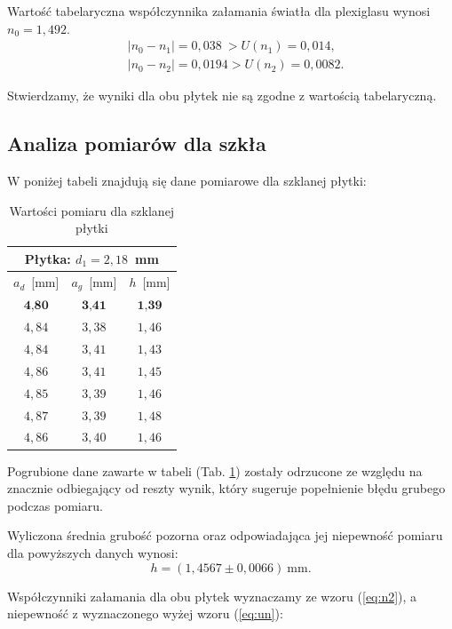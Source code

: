 \documentclass[12pt,a4paper]{article}
\numberwithin{equation}{section}
\begin{document}
Wartość tabelaryczna współczynnika załamania światła dla plexiglasu wynosi $n_0 = 1,492$.
\begin{equation}
	\begin{split}
		&|n_0 - n_1| = 0,038 ~> U(n_1) = 0,014, \\
		&|n_0 - n_2| = 0,0194 > U(n_2) = 0,0082.
	\end{split}
\end{equation}

Stwierdzamy, że wyniki dla obu płytek nie są zgodne z wartością tabelaryczną.

\subsection{Analiza pomiarów dla szkła}

W poniżej tabeli znajdują się dane pomiarowe dla szklanej płytki:

\begin{table}[!ht]
	\caption{Wartości pomiaru dla szklanej płytki}
	\centering
	\begin{tabular}{c|c|c}
		\hline \multicolumn{3}{c}{Płytka: $d_1 = 2,18$~mm} \\ \hline 
		$a_d$~[mm] & $a_g$~[mm] & $h$~[mm] \\ \hline \hline
		$\textbf{4,80}$ & $\textbf{3,41}$ & $\textbf{1,39}$ \\
		$4,84$ & $3,38$ & $1,46$ \\
		$4,84$ & $3,41$ & $1,43$ \\
		$4,86$ & $3,41$ & $1,45$ \\
		$4,85$ & $3,39$ & $1,46$ \\
		$4,87$ & $3,39$ & $1,48$ \\
		$4,86$ & $3,40$ & $1,46$ \\ \hline
	\end{tabular}
	\label{tab:tab2}
\end{table}

Pogrubione dane zawarte w tabeli (Tab. \ref{tab:tab2}) zostały odrzucone ze względu na znacznie odbiegający od reszty wynik, który sugeruje popełnienie błędu grubego podczas pomiaru.

\pagebreak
Wyliczona średnia grubość pozorna oraz odpowiadająca jej niepewność pomiaru dla powyższych danych wynosi:
\begin{equation}
	h = (1,4567 \pm 0,0066)~\textrm{mm}.
\end{equation}

Współczynniki załamania dla obu płytek wyznaczamy ze wzoru (\ref{eq:n2}), a niepewność z wyznaczonego wyżej wzoru (\ref{eq:un}):
\end{document}
